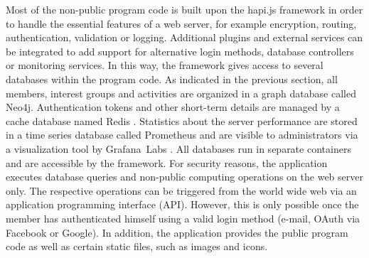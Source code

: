 \documentclass[12pt,numbers=noenddot,parskip,bibliography=totocnumbered,listof=totocnumbered,draft]{scrreprt}
\begin{document}
Most of the non-public program code is built upon the \mbox{hapi.js} \citep{hapijs} framework in order to handle the essential features of a web server, for example encryption, routing, authentication, validation or logging. Additional plugins and external services can be integrated to add support for alternative login methods, database controllers or monitoring services. In this way, the framework gives access to several databases within the program code. As indicated in the previous section, all members, interest groups and activities are organized in a graph database called \mbox{Neo4j}. Authentication tokens and other short-term details are managed by a cache database named \mbox{Redis} \citep{redis}. Statistics about the server performance are stored in a time series database called \mbox{Prometheus} \citep{prometheus} and are visible to administrators via a visualization tool by \mbox{Grafana Labs} \citep{grafana}. All databases run in separate containers and are accessible by the framework. For security reasons, the application executes database queries and non-public computing operations on the web server only. The respective operations can be triggered from the world wide web via an application programming interface (API). However, this is only possible once the member has authenticated himself using a valid login method (e-mail, \mbox{OAuth} via \mbox{Facebook} or \mbox{Google}). In addition, the application provides the public program code as well as certain static files, such as images and icons.
\end{document}
